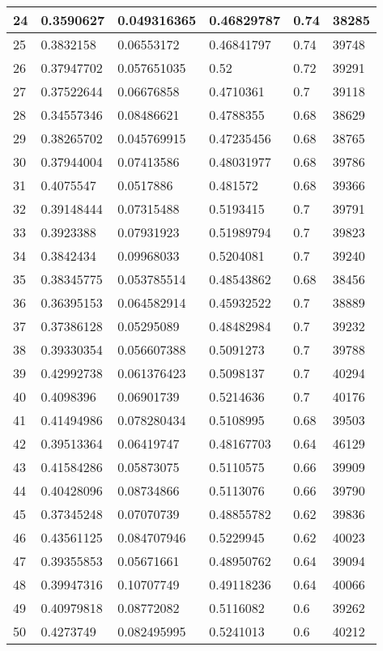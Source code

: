 \begin{longtable}{|l|l|l|l|l|l|}
24 & 0.3590627 & 0.049316365 & 0.46829787 & 0.74 & 38285 \\ \hline 
25 & 0.3832158 & 0.06553172 & 0.46841797 & 0.74 & 39748 \\ \hline 
26 & 0.37947702 & 0.057651035 & 0.52 & 0.72 & 39291 \\ \hline 
27 & 0.37522644 & 0.06676858 & 0.4710361 & 0.7 & 39118 \\ \hline 
28 & 0.34557346 & 0.08486621 & 0.4788355 & 0.68 & 38629 \\ \hline 
29 & 0.38265702 & 0.045769915 & 0.47235456 & 0.68 & 38765 \\ \hline 
30 & 0.37944004 & 0.07413586 & 0.48031977 & 0.68 & 39786 \\ \hline 
31 & 0.4075547 & 0.0517886 & 0.481572 & 0.68 & 39366 \\ \hline 
32 & 0.39148444 & 0.07315488 & 0.5193415 & 0.7 & 39791 \\ \hline 
33 & 0.3923388 & 0.07931923 & 0.51989794 & 0.7 & 39823 \\ \hline 
34 & 0.3842434 & 0.09968033 & 0.5204081 & 0.7 & 39240 \\ \hline 
35 & 0.38345775 & 0.053785514 & 0.48543862 & 0.68 & 38456 \\ \hline 
36 & 0.36395153 & 0.064582914 & 0.45932522 & 0.7 & 38889 \\ \hline 
37 & 0.37386128 & 0.05295089 & 0.48482984 & 0.7 & 39232 \\ \hline 
38 & 0.39330354 & 0.056607388 & 0.5091273 & 0.7 & 39788 \\ \hline 
39 & 0.42992738 & 0.061376423 & 0.5098137 & 0.7 & 40294 \\ \hline 
40 & 0.4098396 & 0.06901739 & 0.5214636 & 0.7 & 40176 \\ \hline 
41 & 0.41494986 & 0.078280434 & 0.5108995 & 0.68 & 39503 \\ \hline 
42 & 0.39513364 & 0.06419747 & 0.48167703 & 0.64 & 46129 \\ \hline 
43 & 0.41584286 & 0.05873075 & 0.5110575 & 0.66 & 39909 \\ \hline 
44 & 0.40428096 & 0.08734866 & 0.5113076 & 0.66 & 39790 \\ \hline 
45 & 0.37345248 & 0.07070739 & 0.48855782 & 0.62 & 39836 \\ \hline 
46 & 0.43561125 & 0.084707946 & 0.5229945 & 0.62 & 40023 \\ \hline 
47 & 0.39355853 & 0.05671661 & 0.48950762 & 0.64 & 39094 \\ \hline 
48 & 0.39947316 & 0.10707749 & 0.49118236 & 0.64 & 40066 \\ \hline 
49 & 0.40979818 & 0.08772082 & 0.5116082 & 0.6 & 39262 \\ \hline 
50 & 0.4273749 & 0.082495995 & 0.5241013 & 0.6 & 40212 \\ \hline 
\end{longtable}